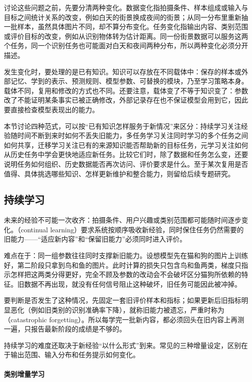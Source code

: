讨论这些问题之前，先要分清两种变化。数据变化指拍摄条件、样本组成或输入与目标之间统计关系的改变，例如白天的街景换成夜间的街景；从同一分布里重新抽一批样本，虽然具体图片不同，却不算分布变化。任务变化指输出内容、类别范围或评价目标的改变，例如从识别物体转为估计距离。同一份街景数据可以服务这两个任务，同一个识别任务也可能面对白天和夜间两种分布，所以两种变化必须分开描述。

发生变化时，要处理的是已有知识。知识可以存放在不同载体中：保存的样本或外部记忆、学到的表示、预测规则、模型参数、可替换的模块，乃至学习策略本身。载体不同，复用和修改的方式也不同。还要注意，载体变了不等于知识变了：参数改了不能证明某条事实已被正确修改，外部记录存在也不保证模型会用到它，因此要直接检查模型表现出的能力。

本节讨论四种范式，可以按“已有知识怎样服务于新情况”来区分：持续学习关注经验随时间不断到来时如何不丢失旧能力，多任务学习关注同时学习的多个任务之间如何共享，迁移学习关注已有的来源知识能否帮助新的目标任务，元学习关注如何从历史任务中学会更快地适应新任务。比较它们时，除了数据和任务怎么变，还要说明任务如何组织、历史数据能否再次访问、评价要求是什么。至于某次复用是否值得、具体挑选哪些知识、怎样更新维护和整合能力，则留给后续专题研究。

\subsection{持续学习}
\label{sec:continual-learning}

未来的经验不可能一次收齐：拍摄条件、用户兴趣或类别范围都可能随时间逐步变化。（continual learning）要求系统按顺序吸收新经验，同时保住任务仍然需要的旧能力——“适应新内容”和“保留旧能力”必须同时进入评价。

难点在于：同一组参数往往同时支撑新旧能力。设想模型先在猫和狗的图片上训练好，第二阶段只拿到鸟和鱼的图片。此时计算的损失只包含鸟和鱼两类，梯度只指示怎样把这两类分得更好，完全不顾及参数的改动会不会破坏区分猫狗所依赖的特征。旧数据不再出现，就没有任何信号阻止这种破坏，旧任务可能因此被冲掉。

要判断是否发生了这种情况，先固定一套旧评价样本和指标；如果更新后旧指标明显恶化（例如旧类别的识别准确率下降），就称旧能力被遗忘，严重时称为（catastrophic forgetting）。所以每学完一批新内容，都必须回头在旧内容上再测一遍，只报告最新阶段的成绩是不够的。

持续学习的难度还取决于新经验“以什么形式”到来。常见的三种增量设定，区别在于输出范围、输入分布和任务提示如何变化。

\paragraph{类别增量学习}

